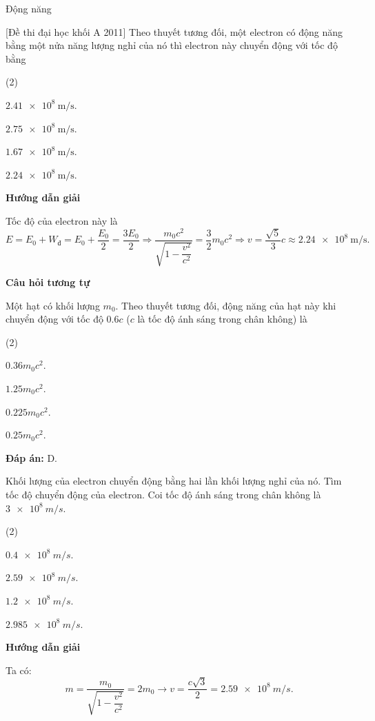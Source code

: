 \begin{dang}{Động năng}
		
		{[Đề thi đại học khối A 2011] Theo thuyết tương đối, một electron có động năng bằng một nửa năng lượng nghỉ của nó thì electron này chuyển động với tốc độ bằng 
		\begin{mcq}(2)
			\item $\SI{2,41e8}{\meter/\second}$.
			\item $\SI{2,75e8}{\meter/\second}$. 
			\item $\SI{1,67e8}{\meter/\second}$. 
			\item $\SI{2,24e8}{\meter/\second}$. 
		\end{mcq}}
		{\begin{center}
			\textbf{Hướng dẫn giải}
		\end{center}
		Tốc độ của electron này là
		\begin{equation*}
		E=E_0+W_\text{đ}=E_0+\dfrac{E_0}{2}=\dfrac{3E_0}{2}\Rightarrow \dfrac{m_0c^2}{\sqrt{1-\dfrac{v^2}{c^2}}} = \dfrac{3}{2}m_0c^2\Rightarrow v=\dfrac{\sqrt{5}}{3}c\approx\SI{2,24e8}{\meter/\second}.
		\end{equation*}
		
		\begin{center}
			\textbf{Câu hỏi tương tự}
		\end{center}
		
		Một hạt có khối lượng $ m_{0} $. Theo thuyết tương đối, động năng của hạt này khi chuyển động với tốc độ $ \num{0,6}c $ ($ c $ là tốc độ ánh sáng trong chân không) là
\begin{mcq}(2)
	\item $ \num{0,36} m_{0}c^{2} $.
	\item $ \num{1,25} m_{0}c^{2} $.
	\item $ \num{0,225} m_{0}c^{2} $.
	\item $ \num{0,25} m_{0}c^{2} $.
\end{mcq}
		
		\textbf{Đáp án:} D.
		}
	
{
Khối lượng của electron chuyển động bằng hai lần khối lượng nghỉ của nó. Tìm tốc độ chuyển động của electron. Coi tốc độ ánh sáng trong chân không là $ \SI{3 e8}{m/s} $.
\begin{mcq}(2)
	\item $ \SI{0,4 e8}{m/s} $.
	\item $ \SI{2,59 e8}{m/s} $.
	\item $ \SI{1,2 e8}{m/s} $.
	\item $ \SI{2,985 e8}{m/s} $.
\end{mcq}
}
{
\begin{center}
	\textbf{Hướng dẫn giải}
\end{center}
Ta có:
$$
	m = \dfrac{m_{0}}{\sqrt{1-\dfrac{v^{2}}{c^{2}}}} = 2m_{0} \rightarrow v = \dfrac{c\sqrt{3}}{2} = \SI{2,59 e8}{m/s}.
$$

}
\end{dang}
